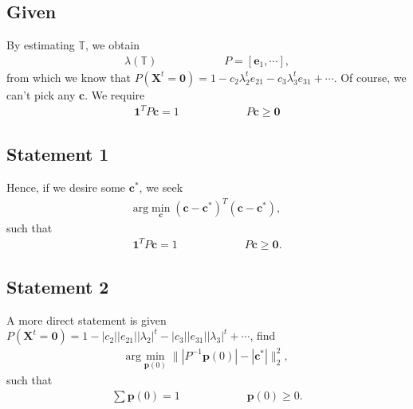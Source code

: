 \documentclass[superscriptaddress]{revtex4-1}
\newcommand{\argmin}[2] {\mathrm{arg}\min_{#1}#2}
\begin{document}
\subsection{Given}
By estimating $\mathbb{T}$, we obtain
\begin{align*}
\lambda(\mathbb{T})
\hspace{1in}
P = [\bm{e}_1, \dotsm],
\end{align*}
from which we know that $P(\bm{X}^t = \bm{0}) = 1 - c_2\lambda_2^te_{21} - c_3\lambda_3^te_{31} + \dotsm$. Of course, we can't pick any $\bm{c}$. We require
\begin{align*}
\bm{1}^TP\bm{c} = 1
\hspace{1in}
P\bm{c} \geq \bm{0}
\end{align*}

\subsection{Statement 1}
Hence, if we desire some $\bm{c}^*$, we seek
\begin{align*}
\argmin{\bm{c}}{(\bm{c}-\bm{c}^*)^T(\bm{c}-\bm{c}^*)},
\end{align*}
such that
\begin{align*}
\bm{1}^TP\bm{c}=1
\hspace{1in}
P\bm{c} \geq \bm{0}.
\end{align*}

\subsection{Statement 2}
A more direct statement is given $P(\bm{X}^t=\bm{0}) = 1 - |c_2||e_{21}||\lambda_2|^t - |c_3||e_{31}||\lambda_3|^t + \dotsm$, find 
\begin{align*}
\argmin{\bm{p}(0)}{\||P^{-1}\bm{p}(0)| - |\bm{c}^*|\|_2^2},
\end{align*}
such that
\begin{align*}
\sum \bm{p}(0) = 1
\hspace{1in}
\bm{p}(0) \geq 0.
\end{align*}

	
	
	
	
\end{document}
